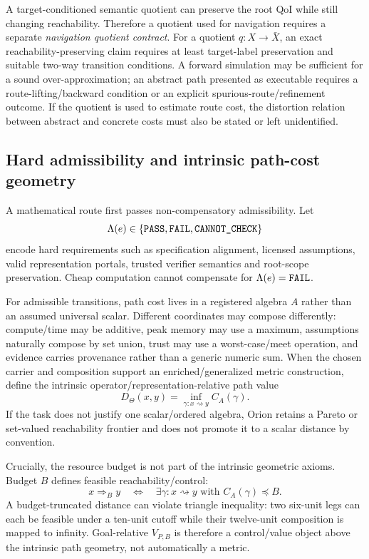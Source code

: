 A target-conditioned semantic quotient can preserve the root QoI while still changing reachability. Therefore a quotient used for navigation requires a separate \emph{navigation quotient contract}. For a quotient $q:X\to\bar X$, an exact reachability-preserving claim requires at least target-label preservation and suitable two-way transition conditions. A forward simulation may be sufficient for a sound over-approximation; an abstract path presented as executable requires a route-lifting/backward condition or an explicit spurious-route/refinement outcome. If the quotient is used to estimate route cost, the distortion relation between abstract and concrete costs must also be stated or left unidentified.

\subsection{Hard admissibility and intrinsic path-cost geometry}
A mathematical route first passes non-compensatory admissibility. Let
\[
\Lambda(e)\in\{\texttt{PASS},\texttt{FAIL},\texttt{CANNOT\_CHECK}\}
\]
encode hard requirements such as specification alignment, licensed assumptions, valid representation portals, trusted verifier semantics and root-scope preservation. Cheap computation cannot compensate for $\Lambda(e)=\texttt{FAIL}$.

For admissible transitions, path cost lives in a registered algebra $A$ rather than an assumed universal scalar. Different coordinates may compose differently: compute/time may be additive, peak memory may use a maximum, assumptions naturally compose by set union, trust may use a worst-case/meet operation, and evidence carries provenance rather than a generic numeric sum. When the chosen carrier and composition support an enriched/generalized metric construction, define the intrinsic operator/representation-relative path value
\[
D_{\Theta}(x,y)=\inf_{\gamma:x\rightsquigarrow y} C_A(\gamma).
\]
If the task does not justify one scalar/ordered algebra, Orion retains a Pareto or set-valued reachability frontier and does not promote it to a scalar distance by convention.

Crucially, the resource budget is not part of the intrinsic geometric axioms. Budget $B$ defines feasible reachability/control:
\[
x\Rightarrow_B y
\quad\Longleftrightarrow\quad
\exists\gamma:x\rightsquigarrow y\text{ with }C_A(\gamma)\preceq B.
\]
A budget-truncated distance can violate triangle inequality: two six-unit legs can each be feasible under a ten-unit cutoff while their twelve-unit composition is mapped to infinity. Goal-relative $V_{P,B}$ is therefore a control/value object above the intrinsic path geometry, not automatically a metric.

